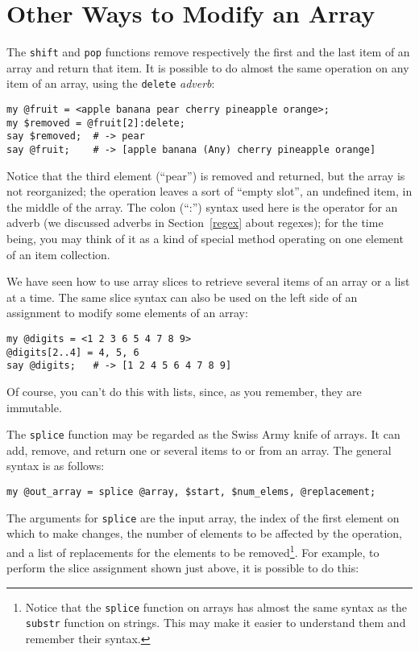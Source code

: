 \section{Other Ways to Modify an Array}
\label{modify_array}

The {\tt shift} and {\tt pop} functions remove respectively 
the first and the last item of an array and return that 
item. It is possible to do almost the same operation on any item 
of an array, using the {\tt delete} \emph{adverb}:

\begin{verbatim}
my @fruit = <apple banana pear cherry pineapple orange>;
my $removed = @fruit[2]:delete; 
say $removed;  # -> pear
say @fruit;    # -> [apple banana (Any) cherry pineapple orange]
\end{verbatim}

Notice that the third element (``pear'') is removed and 
returned, but the array is not reorganized; the operation leaves 
a sort of ``empty slot'', an undefined item, in the 
middle of the array. The colon (``:'') syntax used here is the 
operator for an adverb (we discussed adverbs in  
Section~\ref{regex} about regexes); 
for the time being, you may think of it as a kind of special 
method operating on one element of an item collection.

We have seen how to use array slices to retrieve several 
items of an array or a list at a time. The same slice syntax 
can also be used on the left side of an assignment to modify 
some elements of an array:

\begin{verbatim}
my @digits = <1 2 3 6 5 4 7 8 9>
@digits[2..4] = 4, 5, 6
say @digits;   # -> [1 2 4 5 6 4 7 8 9]
\end{verbatim}

Of course, you can't do this with lists, since, as you 
remember, they are immutable.

The {\tt splice} function may be regarded as the Swiss Army 
knife of arrays. It can add, remove, and return one or 
several items to or from an array. The general syntax is 
as follows:

\begin{verbatim}
my @out_array = splice @array, $start, $num_elems, @replacement;
\end{verbatim}
%
The arguments for {\tt splice} are the input array, the index 
of the first element on which to make changes, the number of 
elements to be affected by the operation, and a list of 
replacements for the elements to be removed\footnote{Notice that 
the {\tt splice} function on arrays has almost the same syntax 
as the {\tt substr} function on strings. This may make it easier 
to understand them and remember their syntax.}. For example, 
to perform the slice assignment shown just above, it is 
possible to do this:

